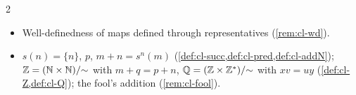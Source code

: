 \begin{paracol}{2}
\begin{keyconcepts}
\begin{itemize}
        $M/{\sim}$ and complete system of representatives (\cref{def:cl-equiv,def:cl-class,prop:cl-classes,def:cl-quotient,rem:cl-representatives}).
  \item Well-definedness of maps defined through representatives (\cref{rem:cl-wd}).
  \item $s(n)=\{n\}$, $p$, $m+n=s^n(m)$ (\cref{def:cl-succ,def:cl-pred,def:cl-addN}); $\mathbb Z=(\mathbb{N}\times\mathbb{N})/{\sim}$ with
        $m+q=p+n$, $\mathbb{Q}=(\mathbb Z\times\mathbb Z^*)/{\sim}$ with $xv=uy$ (\cref{def:cl-Z,def:cl-Q}); the fool's addition
        (\cref{rem:cl-fool}).
\end{itemize}
\end{keyconcepts}

\flushside
\end{paracol}
